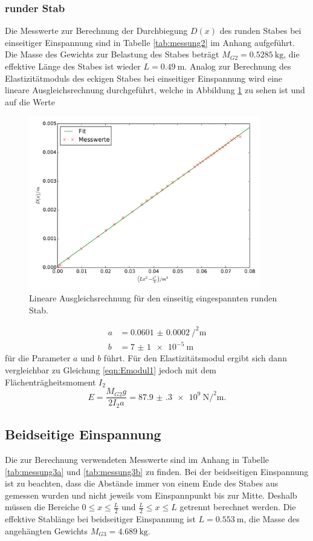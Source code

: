 \subsubsection{runder Stab}
Die Messwerte zur Berechnung der Durchbiegung $D(x)$ des runden Stabes bei
einseitiger Einspannung sind in Tabelle \ref{tab:messung2} im Anhang aufgeführt.
Die Masse des Gewichts zur Belastung des Stabes beträgt $M_{G2} = \SI{0.5285}
{\kilo\gram}$, die effektive Länge des Stabes ist wieder $L=\SI{0.49}
{\meter}$. Analog zur Berechnung des Elastizitätmoduls des eckigen Stabes bei
einseitiger Einspannung wird eine lineare Ausgleichsrechnung durchgeführt, welche
in Abbildung \ref{fig:plot_einseitig2} zu sehen ist und auf die Werte
\begin{figure}
  \centering
  \includegraphics[width=0.9\textwidth]{stab2_einseitig.pdf}
  \caption{Lineare Ausgleichsrechnung für den einseitig eingespannten runden Stab.}
  \label{fig:plot_einseitig2}
\end{figure}
\begin{align*}
  a &= \SI{0.0601(2)}{\per\squared\meter} \\
  b &= \SI{7(1)e-5}{\meter}
\end{align*}
für die Parameter $a$ und $b$ führt. Für den Elastizitätsmodul ergibt sich dann
vergleichbar zu Gleichung \eqref{eqn:Emodul1} jedoch mit dem Flächenträgheitsmoment
$I_2$
\begin{equation}
  E = \frac{M_{G2} g}{2 I_2 a} = \SI{87.9(3)e+9}{\newton\per\squared\meter}.
\end{equation}

\subsection{Beidseitige Einspannung}
Die zur Berechnung verwendeten Messwerte sind im Anhang in Tabelle \ref{tab:messung3a}
und \ref{tab:messung3b} zu finden. Bei der beidseitigen Einspannung ist zu
beachten, dass die Abstände immer von einem Ende des Stabes aus gemessen wurden
und nicht jeweils vom Einspannpunkt bis zur Mitte. Deshalb müssen die Bereiche
$0\leq x \leq \frac{L}{2}$ und $\frac{L}{2}\leq x \leq L$ getrennt berechnet
werden. Die effektive Stablänge bei beidseitiger Einspannung ist $L= \SI{0.553}
{\meter}$, die Masse des angehängten Gewichts $M_{G3} = \SI{4.689} {\kilo\gram}$.

